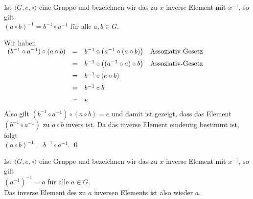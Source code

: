 \begin{Satz}[$(a \circ b)^{-1} = b^{-1} \circ a^{-1}$] \lb
  Ist $\langle G, e, \circ \rangle$ eine Gruppe und bezeichnen wir das zu $x$ inverse Element mit
  $x^{-1}$, so gilt
  \\[0.2cm]
  \hspace*{1.3cm}
  $(a \circ b)^{-1} = b^{-1} \circ a^{-1}$ \quad f\"{u}r alle $a,b \in G$.
\end{Satz}
\pagebreak

\proof
Wir haben
\\[0.2cm]
\hspace*{1.3cm}
$
\begin{array}[t]{lcll}
  (b^{-1} \circ a^{-1}) \circ (a \circ b) & = & b^{-1} \circ \bigl(a^{-1} \circ (a \circ b)\bigr) 
                                              & \mbox{Assoziativ-Gesetz} \\[0.2cm]
                                          & = & b^{-1} \circ \bigl((a^{-1} \circ a) \circ b\bigr) 
                                              & \mbox{Assoziativ-Gesetz} \\[0.2cm]
                                          & = & b^{-1} \circ (e \circ b) \\[0.2cm]
                                          & = & b^{-1} \circ b \\[0.2cm]
                                          & = & e \\[0.2cm]
\end{array}
$
\\[0.2cm]
Also gilt $(b^{-1} \circ a^{-1}) \circ (a \circ b) = e$ und damit ist gezeigt,  dass das Element
$(b^{-1} \circ a^{-1})$ zu $a \circ b$ invers ist.  Da das inverse Element eindeutig bestimmt ist, folgt
\\[0.2cm]
\hspace*{1.3cm}
$(a \circ b)^{-1} = b^{-1} \circ a^{-1}$. \qed


\begin{Satz}[$(a^{-1})^{-1} = a$]
  Ist $\langle G, e, \circ \rangle$ eine Gruppe und bezeichnen wir das zu $x$ inverse Element mit
  $x^{-1}$, so gilt
  \\[0.2cm]
  \hspace*{1.3cm}
  $(a^{-1})^{-1} = a$ \quad f\"{u}r alle $a \in G$.
  \\[0.2cm]
  Das inverse Element des zu $a$ inversen Elements ist also wieder $a$.
\end{Satz}

